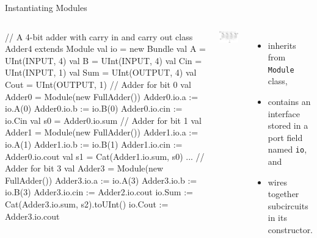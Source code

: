\documentclass[xcolor=pdflatex,dvipsnames,table]{beamer}
\begin{document}
\begin{frame}[fragile]{Instantiating Modules}

\begin{columns}


{
\begin{scala}
// A 4-bit adder with carry in and carry out
class Adder4 extends Module {
  val io = new Bundle {
    val A    = UInt(INPUT, 4)
    val B    = UInt(INPUT, 4)
    val Cin  = UInt(INPUT, 1)
    val Sum  = UInt(OUTPUT, 4)
    val Cout = UInt(OUTPUT, 1)
  }
  // Adder for bit 0
  val Adder0 = Module(new FullAdder())
  Adder0.io.a   := io.A(0)
  Adder0.io.b   := io.B(0)
  Adder0.io.cin := io.Cin
  val s0 = Adder0.io.sum
  // Adder for bit 1
  val Adder1 = Module(new FullAdder())
  Adder1.io.a   := io.A(1)
  Adder1.io.b   := io.B(1)
  Adder1.io.cin := Adder0.io.cout
  val s1 = Cat(Adder1.io.sum, s0)
  ...
  // Adder for bit 3
  val Adder3 = Module(new FullAdder())
  Adder3.io.a   := io.A(3)
  Adder3.io.b   := io.B(3)
  Adder3.io.cin := Adder2.io.cout
  io.Sum  := Cat(Adder3.io.sum, s2).toUInt()
  io.Cout := Adder3.io.cout
}
\end{scala}
}


\includegraphics[width=0.9\textwidth]{../tootorial/03_module_instantiation/4_Bit_Adder.jpg}

\begin{itemize}
\item inherits from \verb+Module+ class,
\item contains an interface stored in a port field named \verb+io+, and
\item wires together subcircuits in its constructor.
\end{itemize}

\end{columns}

\end{frame}
\end{document}
